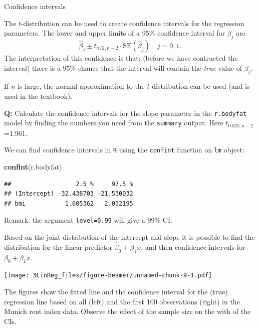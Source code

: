 \documentclass[10pt,ignorenonframetext,]{beamer}
\newenvironment{Shaded}{\begin{snugshade}}{\end{snugshade}}
\newcommand{\KeywordTok}[1]{\textcolor[rgb]{0.13,0.29,0.53}{\textbf{#1}}}
\newcommand{\NormalTok}[1]{#1}
\begin{document}
\begin{frame}[fragile]

\begin{block}{Confidence intervals}

The \(t\)-distribution can be used to create confidence intervals for
the regression parameters. The lower and upper limits of a 95\%
confidence interval for \(\beta_j\) are
\[\hat{\beta}_j \pm t_{\alpha/2,n-2} \cdot\text{SE} (\hat{\beta}_j) \quad j=0, 1.\]
The interpretation of this confidence is that: (before we have
contructed the interval) there is a 95\% chance that the interval will
contain the \emph{true} value of \(\beta_j\).

If \(n\) is large, the normal approximation to the \(t\)-distribution
can be used (and is used in the textbook).

\textbf{Q:} Calculate the confidence intervals for the slope parameter
in the \texttt{r.bodyfat} model by finding the numbers you need from the
\texttt{summary} output. Here \(t_{0.025,n-2}\)=1.961.

\end{block}

\end{frame}

\begin{frame}[fragile]

We can find confidence intervals in \texttt{R} using the
\texttt{confint} function on \texttt{lm} object:

\begin{Shaded}
\begin{Highlighting}[]
\KeywordTok{confint}\NormalTok{(r.bodyfat)}
\end{Highlighting}
\end{Shaded}

\begin{verbatim}
##                  2.5 %     97.5 %
## (Intercept) -32.438703 -21.530032
## bmi           1.605362   2.032195
\end{verbatim}

Remark: the argument \texttt{level=0.99} will give a 99\% CI.

Based on the joint distribution of the intercept and slope it is
possible to find the distribution for the linear predictor
\(\hat{\beta}_0+\hat{\beta}_1 x\), and then confidence intervals for
\(\beta_0+\beta_1 x\).

\end{frame}

\begin{frame}

\texttt{[image: 3LinReg\_files/figure-beamer/unnamed-chunk-9-1.pdf]}

The figures show the fitted line and the confidence interval for the
(true) regression line based on all (left) and the first 100
observations (right) in the Munich rent index data. Observe the effect
of the sample size on the with of the CIs.

\end{frame}
\end{document}
